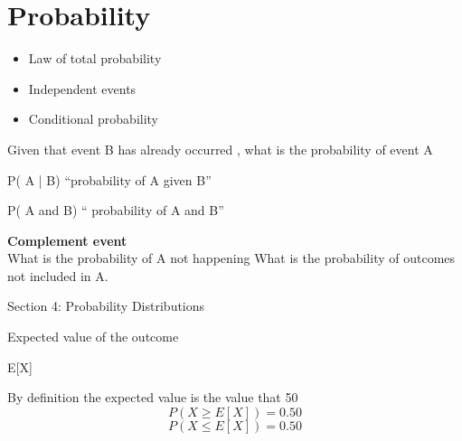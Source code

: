 \documentclass{beamer}
\begin{document}
\section{Probability}
\begin{frame}
	
\begin{itemize}
\item Law of total probability
	
\item Independent events
	
\item Conditional probability
\end{itemize}	

\end{frame}
\begin{frame}
	
	Given that event B has already occurred ,   what is the probability of event A
	
	P( A | B)  “probability of A given B”
	
	P( A and B) “ probability of A and B”
	
	\textbf{Complement event}\\
	
	What is the probability of A not happening
	What is the probability of outcomes not included in A.
	
\end{frame}
\begin{frame}
	
	Section 4: Probability Distributions
	
	Expected value of the outcome
	
	E[X]
	
	By definition the expected value is the value that 50%
	\[
	P( X \geq E[X])  = 0.50 \]
	\[ P(X \leq E[X]) = 0.50\]
\end{frame}
\end{document}
